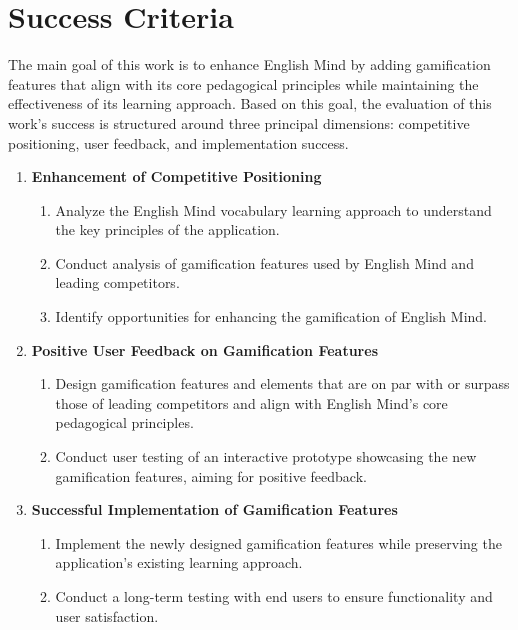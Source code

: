 \newpage

\section{Success Criteria}
\label{sec:success-criteria}

The main goal of this work is to enhance English Mind by adding gamification features that align with its core pedagogical principles while maintaining the effectiveness of its learning approach. Based on this goal, the evaluation of this work's success is structured around three principal dimensions: competitive positioning, user feedback, and implementation success.

\begin{enumerate}
    \item \textbf{Enhancement of Competitive Positioning}
    \begin{enumerate}
        \item Analyze the English Mind vocabulary learning approach to understand the key principles of the application.
        \item Conduct analysis of gamification features used by English Mind and leading competitors.
        \item Identify opportunities for enhancing the gamification of English Mind.
    \end{enumerate}

    \item \textbf{Positive User Feedback on Gamification Features}
    \begin{enumerate}
        \item Design gamification features and elements that are on par with or surpass those of leading competitors and align with English Mind's core pedagogical principles.
        \item Conduct user testing of an interactive prototype showcasing the new gamification features, aiming for positive feedback.
    \end{enumerate}

    \item \textbf{Successful Implementation of Gamification Features}
    \begin{enumerate}
        \item Implement the newly designed gamification features while preserving the application's existing learning approach.
        \item Conduct a long-term testing with end users to ensure functionality and user satisfaction.
    \end{enumerate}
\end{enumerate}
